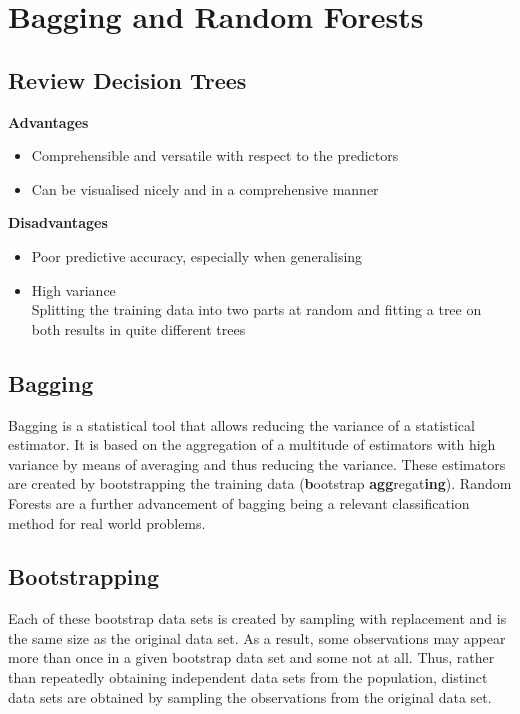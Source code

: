 \documentclass[11pt]{article}
\theoremstyle{definition}
\begin{document}
\section{Bagging and Random Forests}
\subsection{Review Decision Trees}
\textbf{Advantages}
\begin{itemize}
	\item Comprehensible and versatile with respect to the predictors
	\item Can be visualised nicely and in a comprehensive manner
\end{itemize}

\vspace{1em}
\noindent
\textbf{Disadvantages}
\begin{itemize}
	\item Poor predictive accuracy, especially when generalising
	\item High variance\\
	Splitting the training data into two parts at random and fitting a tree on both results in quite different trees
\end{itemize}

\subsection{Bagging}
Bagging is a statistical tool that allows reducing the variance of a statistical estimator. It is based on the aggregation of a multitude of estimators with high variance by means of averaging and thus reducing the variance. These estimators are created by bootstrapping the training data (\textbf{b}ootstrap \textbf{agg}regat\textbf{ing}). Random Forests are a further advancement of bagging being a relevant classification method for real world problems.

\subsection{Bootstrapping}
Each of these bootstrap data sets is created by sampling with replacement and is the same size as the original data set. As a result, some observations may appear more than once in a given bootstrap data set and some not at all. Thus, rather than repeatedly obtaining independent data sets from the population, distinct data sets are obtained by sampling the observations from the original data set.
\end{document}
